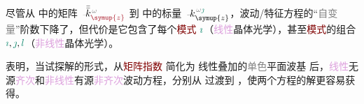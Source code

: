 尽管从  中的矩阵 $\Xint{\begin{smallmatrix} ~ \\ {}^{}_{\mathcolor{gray}{-}} \\ ~ \end{smallmatrix}}{15}{\bar{\bar{k}}}_{\textcolor{Maroon}{\symup{z}}}^{\;\! \mathcolor{gray}{\omega}}$ 到  中的标量 $\Xint{\begin{smallmatrix} ~ \\ {}^{}_{\mathcolor{gray}{-}} \\ ~ \end{smallmatrix}}{15}{k}_{\symup{z}}^{\;\! \mathcolor{gray}{\omega} \textcolor{PineGreen}{\jmath}}$，波动/\textcolor{PineGreen}{特征方程}的“\textcolor{gray}{自变量}”阶数下降了，但代价是它包含了每个\textcolor{Maroon}{模式} $\textcolor{PineGreen}{\imath}$（\textcolor{Plum}{线性}\textcolor{PineGreen}{晶体光学}），甚至\textcolor{Maroon}{模式}的组合 $\textcolor{PineGreen}{\imath},\textcolor{PineGreen}{\jmath},\textcolor{PineGreen}{l}$（\textcolor{Plum}{非线性}\textcolor{PineGreen}{晶体光学}）。

 表明，当试探解的形式，从\textcolor{Maroon}{矩阵指数}  简化为 \textcolor{PineGreen}{线性叠加}的\textcolor{gray}{单色}\textcolor{PineGreen}{平面波基} 后，\textcolor{Plum}{线性}\textcolor{NavyBlue}{无源}\textcolor{Plum}{齐次}和\textcolor{Plum}{非线性}\textcolor{NavyBlue}{有源}\textcolor{Plum}{非齐次}波动方程，分别从  过渡到 ，使两个方程的解更容易获得。

